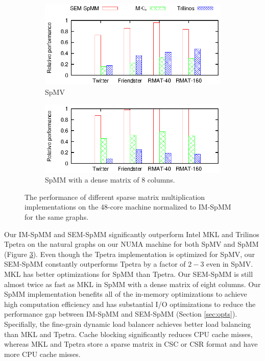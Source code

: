 \begin{figure}
	\footnotesize
	\centering
	\begin{subfigure}[b]{0.5\textwidth}
		\centering
		\includegraphics[scale=1]{SpMM_figs/SpMV-awesomer.eps}
		\vspace{-5pt}
		\caption{SpMV}
		\label{perf:spmv}
	\end{subfigure}
	\begin{subfigure}[b]{0.5\textwidth}
		\centering
		\includegraphics[scale=1]{SpMM_figs/SpMM-awesomer.eps}
		\vspace{-5pt}
		\caption{SpMM with a dense matrix of 8 columns.}
		\label{perf:spmm8}
	\end{subfigure}
	\vspace{3pt}
	\caption{The performance of different sparse matrix multiplication
		implementations on the 48-core machine normalized to IM-SpMM for
	the same graphs.}
	\label{perf:spmm}
\end{figure}

Our IM-SpMM and SEM-SpMM significantly outperform Intel MKL and
Trilinos Tpetra on the natural
graphs on our NUMA machine for both SpMV and SpMM (Figure \ref{perf:spmm}).
Even though the Tpetra implementation is optimized for SpMV, our SEM-SpMM
constantly outperforms Tpetra by a factor of $2-3$ even in SpMV. MKL has
better optimizations for SpMM than Tpetra. Our SEM-SpMM is still almost
twice as fast as MKL in SpMM with a dense matrix of eight columns. Our SpMM
implementation benefits all of the in-memory optimizations to achieve high
computation efficiency and has substantial I/O optimizations to reduce
the performance gap between IM-SpMM and SEM-SpMM (Section \ref{sec:opts}).
Specifially, the fine-grain dynamic load balancer achieves better load balancing
than MKL and Tpetra. Cache blocking significantly reduces CPU cache misses,
whereas MKL and Tpetra store a sparse matrix in CSC or CSR format and have
more CPU cache misses. %

